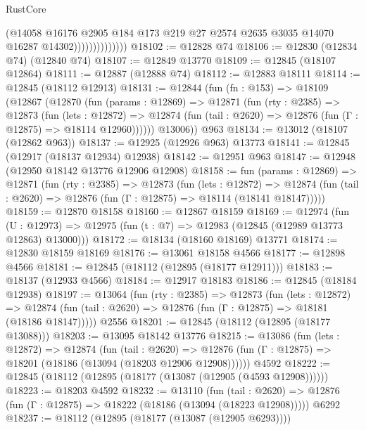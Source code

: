 \begin{lexlean}{RustCore}
\begin{coremodule}
                              (@14058
                                @16176
                                @2905
                                @184
                                @173
                                @219
                                @27
                                @2574
                                @2635
                                @3035
                                @14070
                                @16287
                                @14302))))))))))))))
@18102 := @12828 @74
@18106 := @12830 (@12834 @74) (@12840 @74)
@18107 := @12849 @13770
@18109 := @12845 (@18107 @12864)
@18111 := @12887 (@12888 @74)
@18112 := @12883 @18111
@18114 := @12845 (@18112 @12913)
@18131 := @12844
    (fun (fn : @153) =>
    @18109
      (@12867
        (@12870
          (fun (params : @12869) =>
          @12871
            (fun (rty : @2385) =>
            @12873
              (fun (lets : @12872) =>
              @12874 (fun (tail : @2620) => @12876 (fun (Γ : @12875) => @18114 @12960))))))
        @13006))
    @963
@18134 := @13012 (@18107 (@12862 @963))
@18137 := @12925 (@12926 @963) @13773
@18141 := @12845 (@12917 (@18137 @12934) @12938)
@18142 := @12951 @963
@18147 := @12948 (@12950 @18142 @13776 @12906 @12908)
@18158 := fun (params : @12869) =>
  @12871
    (fun (rty : @2385) =>
    @12873
      (fun (lets : @12872) =>
      @12874 (fun (tail : @2620) => @12876 (fun (Γ : @12875) => @18114 (@18141 @18147)))))
@18159 := @12870 @18158
@18160 := @12867 @18159
@18169 := @12974
    (fun (U : @12973) => @12975 (fun (t : @7) => @12983 (@12845 (@12989 @13773 @12863) @13000)))
@18172 := @18134 (@18160 @18169) @13771
@18174 := @12830 @18159 @18169
@18176 := @13061 @18158 @4566
@18177 := @12898 @4566
@18181 := @12845 (@18112 (@12895 (@18177 @12911)))
@18183 := @18137 (@12933 @4566)
@18184 := @12917 @18183
@18186 := @12845 (@18184 @12938)
@18197 := @13064
    (fun (rty : @2385) =>
    @12873
      (fun (lets : @12872) =>
      @12874 (fun (tail : @2620) => @12876 (fun (Γ : @12875) => @18181 (@18186 @18147)))))
    @2556
@18201 := @12845 (@18112 (@12895 (@18177 @13088)))
@18203 := @13095 @18142 @13776
@18215 := @13086
    (fun (lets : @12872) =>
    @12874
      (fun (tail : @2620) =>
      @12876 (fun (Γ : @12875) => @18201 (@18186 (@13094 (@18203 @12906 @12908))))))
    @4592
@18222 := @12845 (@18112 (@12895 (@18177 (@13087 (@12905 (@4593 @12908))))))
@18223 := @18203 @4592
@18232 := @13110
    (fun (tail : @2620) => @12876 (fun (Γ : @12875) => @18222 (@18186 (@13094 (@18223 @12908)))))
    @6292
@18237 := @18112 (@12895 (@18177 (@13087 (@12905 @6293))))

\end{coremodule}
\end{lexlean}
